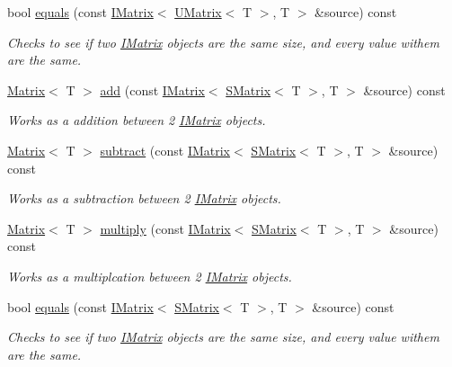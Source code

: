 \begin{DoxyCompactItemize}
bool \mbox{\hyperlink{class_u_matrix_a2d9385b4b327a287d76456b105d9d3b7}{equals}} (const \mbox{\hyperlink{class_i_matrix}{I\+Matrix}}$<$ \mbox{\hyperlink{class_u_matrix}{U\+Matrix}}$<$ T $>$, T $>$ \&source) const
\begin{DoxyCompactList}\small\item\em Checks to see if two \mbox{\hyperlink{class_i_matrix}{I\+Matrix}} objects are the same size, and every value withem are the same. \end{DoxyCompactList}\item 
\mbox{\hyperlink{class_matrix}{Matrix}}$<$ T $>$ \mbox{\hyperlink{class_u_matrix_ae57a66445e3d0e1a49e1f7a241a6b9ba}{add}} (const \mbox{\hyperlink{class_i_matrix}{I\+Matrix}}$<$ \mbox{\hyperlink{class_s_matrix}{S\+Matrix}}$<$ T $>$, T $>$ \&source) const
\begin{DoxyCompactList}\small\item\em Works as a addition between 2 \mbox{\hyperlink{class_i_matrix}{I\+Matrix}} objects. \end{DoxyCompactList}\item 
\mbox{\hyperlink{class_matrix}{Matrix}}$<$ T $>$ \mbox{\hyperlink{class_u_matrix_a10f1e6de36286b21e1a18a11ad013163}{subtract}} (const \mbox{\hyperlink{class_i_matrix}{I\+Matrix}}$<$ \mbox{\hyperlink{class_s_matrix}{S\+Matrix}}$<$ T $>$, T $>$ \&source) const
\begin{DoxyCompactList}\small\item\em Works as a subtraction between 2 \mbox{\hyperlink{class_i_matrix}{I\+Matrix}} objects. \end{DoxyCompactList}\item 
\mbox{\hyperlink{class_matrix}{Matrix}}$<$ T $>$ \mbox{\hyperlink{class_u_matrix_a834696f0f6c118037fc60efe333b4f13}{multiply}} (const \mbox{\hyperlink{class_i_matrix}{I\+Matrix}}$<$ \mbox{\hyperlink{class_s_matrix}{S\+Matrix}}$<$ T $>$, T $>$ \&source) const
\begin{DoxyCompactList}\small\item\em Works as a multiplcation between 2 \mbox{\hyperlink{class_i_matrix}{I\+Matrix}} objects. \end{DoxyCompactList}\item 
bool \mbox{\hyperlink{class_u_matrix_a1bd38490c7258573ddd303fe41b2d36d}{equals}} (const \mbox{\hyperlink{class_i_matrix}{I\+Matrix}}$<$ \mbox{\hyperlink{class_s_matrix}{S\+Matrix}}$<$ T $>$, T $>$ \&source) const
\begin{DoxyCompactList}\small\item\em Checks to see if two \mbox{\hyperlink{class_i_matrix}{I\+Matrix}} objects are the same size, and every value withem are the same. \end{DoxyCompactList}\item 

\end{DoxyCompactItemize}
